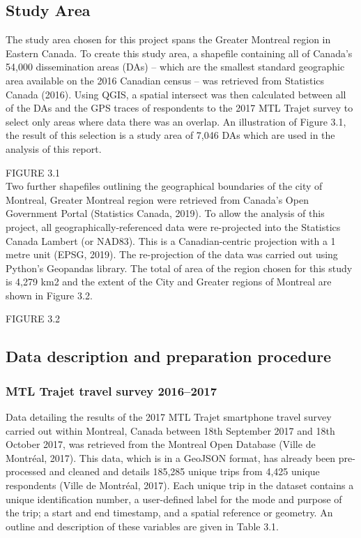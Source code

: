 \subsection{Study Area}
The study area chosen for this project spans the Greater Montreal region in Eastern Canada. To create this study area, a shapefile containing all of Canada’s 54,000 dissemination areas (DAs) – which are the smallest standard geographic area available on the 2016 Canadian census – was retrieved from Statistics Canada (2016). Using QGIS, a spatial intersect was then calculated between all of the DAs and the GPS traces of respondents to the 2017 MTL Trajet survey to select only areas where data there was an overlap. An illustration of Figure 3.1, the result of this selection is a study area of 7,046 DAs which are used in the analysis of this report.

FIGURE 3.1
\\

Two further shapefiles outlining the geographical boundaries of the city of Montreal, Greater Montreal region were retrieved from Canada’s Open Government Portal (Statistics Canada, 2019). To allow the analysis of this project, all geographically-referenced data were re-projected into the Statistics Canada Lambert (or NAD83). This is a Canadian-centric projection with a 1 metre unit (EPSG, 2019). The re-projection of the data was carried out using Python’s Geopandas library. The total of area of the region chosen for this study is 4,279 km2 and the extent of the City and Greater regions of Montreal are shown in Figure 3.2.

FIGURE 3.2
\\

\subsection{Data description and preparation procedure}
\subsubsection{MTL Trajet travel survey 2016–2017}
Data detailing the results of the 2017 MTL Trajet smartphone travel survey carried out within Montreal, Canada between 18th September 2017 and 18th October 2017, was retrieved from the Montreal Open Database (Ville de Montr\'eal, 2017). This data, which is in a GeoJSON format, has already been pre-processed and cleaned and details 185,285 unique trips from 4,425 unique respondents (Ville de Montr\'eal, 2017). Each unique trip in the dataset contains a unique identification number, a user-defined label for the mode and purpose of the trip; a start and end timestamp, and a spatial reference or geometry. An outline and description of these variables are given in Table 3.1.

